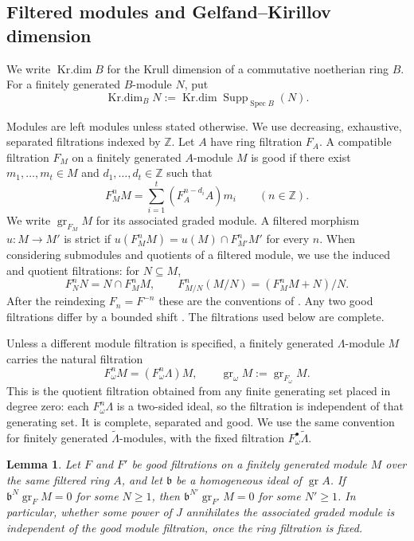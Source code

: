 \documentclass[11pt]{article}
\numberwithin{equation}{section}
\newtheorem{lemma}[theorem]{Lemma}
\theoremstyle{definition}
\theoremstyle{remark}
\newcommand{\Z}{\mathbb Z}
\DeclareMathOperator{\gr}{gr}
\DeclareMathOperator{\Supp}{Supp}
\DeclareMathOperator{\Spec}{Spec}
\DeclareMathOperator{\Krdim}{Kr.dim}
\begin{document}
\subsection{Filtered modules and Gelfand--Kirillov dimension}
\label{subsec:filtrations-dimension}

We write $\Krdim B$ for the Krull dimension of a commutative
noetherian ring $B$. For a finitely generated $B$-module $N$, put
\[
 \Krdim_B N:=\Krdim\Supp_{\Spec B}(N).
\]

Modules are left modules unless stated otherwise. We use decreasing,
exhaustive, separated filtrations indexed by $\Z$. Let $A$ have
ring filtration $F_A$. A compatible filtration $F_M$ on a finitely
generated $A$-module $M$ is good if there exist
$m_1,\ldots,m_t\in M$ and $d_1,\ldots,d_t\in\Z$ such that
\[
 F_M^nM=\sum_{i=1}^t(F_A^{n-d_i}A)m_i\qquad(n\in\Z).
\]
We write $\gr_{F_M}M$ for its associated graded module.
A filtered morphism $u:M\to M'$ is strict if
$u(F_M^nM)=u(M)\cap F_{M'}^nM'$ for every $n$. When considering
submodules and quotients of a filtered module, we use the induced
and quotient filtrations: for $N\subseteq M$,
\[
 F_N^nN=N\cap F_M^nM,\qquad
 F_{M/N}^n(M/N)=(F_M^nM+N)/N.
\]
After the reindexing $F_n=F^{-n}$ these are the conventions of
\cite[\S\S~I.4--I.5]{LvO96}.
Any two good filtrations differ by a bounded shift
\cite[Lemma~I.5.3]{LvO96}. The filtrations used below are complete.

Unless a different module filtration is specified, a finitely generated
$\Lambda$-module $M$ carries the natural filtration
\[
 F_\omega^nM=(F_\omega^n\Lambda)M,
 \qquad \gr_\omega M:=\gr_{F_\omega}M.
\]
This is the quotient filtration obtained from any finite generating
set placed in degree zero: each $F_\omega^n\Lambda$ is a two-sided
ideal, so the filtration is independent of that generating set.
It is complete, separated and good. We use the same convention for
finitely generated $\widetilde\Lambda$-modules, with the fixed
filtration $F_\omega^\bullet\widetilde\Lambda$.

\begin{lemma}\label{lem:good-filtration-annihilation}
Let $F$ and $F'$ be good filtrations on a finitely generated module
$M$ over the same filtered ring $A$, and let $\mathfrak b$ be a
homogeneous ideal of $\gr A$. If
$\mathfrak b^N\gr_F M=0$ for some $N\geq1$, then
$\mathfrak b^{N'}\gr_{F'}M=0$ for some $N'\geq1$.
In particular, whether some power of $J$ annihilates the associated
graded module is independent of the good module filtration, once
the ring filtration is fixed.
\end{lemma}
\end{document}
